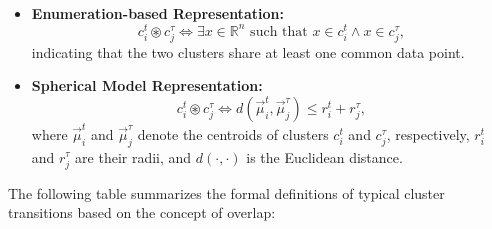 \begin{itemize}
    \item \textbf{Enumeration-based Representation:}
          \begin{equation}
              c_i^t \circledast c_j^\tau \iff \exists x \in \mathbb{R}^n \text{ such that } x \in c_i^t \land x \in c_j^\tau,
          \end{equation}
          indicating that the two clusters share at least one common data point.

    \item \textbf{Spherical Model Representation:}
          \begin{equation}
              c_i^t \circledast c_j^\tau \iff d(\vec{\mu}_i^t, \vec{\mu}_j^\tau) \leq r_i^t + r_j^\tau,
          \end{equation}
          where $ \vec{\mu}_i^t $ and $ \vec{\mu}_j^\tau $ denote the centroids of
          clusters $ c_i^t $ and $ c_j^\tau $, respectively, $ r_i^t $ and $ r_j^\tau $
          are their radii, and $ d(\cdot, \cdot) $ is the Euclidean distance.
\end{itemize}

The following table summarizes the formal definitions of typical cluster
transitions based on the concept of overlap:

